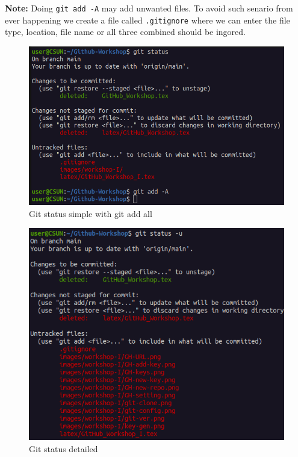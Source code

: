 \documentclass[12pt, a4paper]{article}
\begin{document}
\textbf{Note:} Doing \texttt{git add -A} may add unwanted files. To avoid such senario from ever happening we create a file called \verb+.gitignore+ where we can enter the file type, location, file name or all three combined should be ingored.
\begin{figure}[H]
\centering
\includegraphics[scale=0.5]{../images/workshop-I/git-add.png}
\caption{Git status simple with git add all}
\end{figure}
\begin{figure}[H]
\centering
\includegraphics[scale=0.5]{../images/workshop-I/git-status-u.png}
\caption{Git status detailed}
\end{figure}
\end{document}
